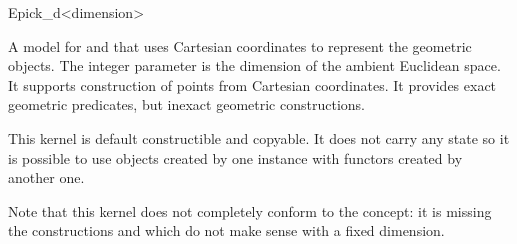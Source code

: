 \begin{ccRefClass}{Epick_d<dimension>}


\ccDefinition
A model for  and  that
uses Cartesian coordinates to represent the geometric objects.  The
integer parameter  is the dimension of the ambient
Euclidean space. It supports construction of points from 
Cartesian coordinates. It provides exact geometric predicates, but
inexact geometric constructions.

This kernel is default constructible and copyable. It does not carry any state so it is possible to use objects created by one instance with functors created by another one.

Note that this kernel does not completely conform to the 
concept: it is missing the constructions  and
 which do not make sense with a fixed
dimension.

\ccIsModel
{}


\ccSeeAlso
{}




\end{ccRefClass}
